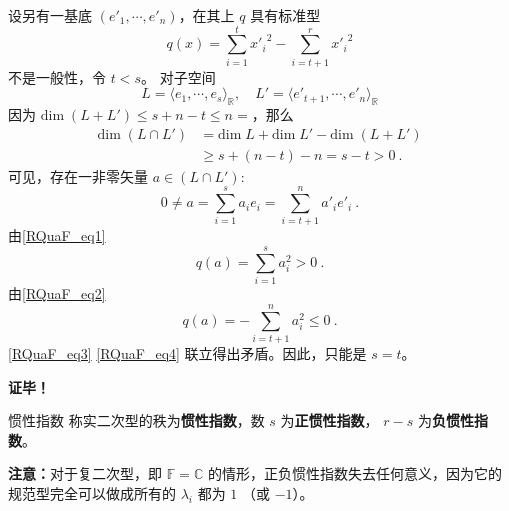 设另有一基底 $( e'_1,\cdots, e'_n)$，在其上 $q$ 具有标准型
\begin{equation}\label{RQuaF_eq2}
q( x)=\sum_{i=1}^{t}{x'_i}^2-\sum_{i=t+1}^{r} {x'_{i}}^{2}
\end{equation}
不是一般性，令 $t<s$。
对子空间
\begin{equation}
L=\langle  e_1,\cdots, e_s\rangle_\mathbb{R},\quad L'=\langle  e'_{t+1},\cdots, e'_n\rangle_\mathbb{R}
\end{equation}
因为 $\mathrm{dim}\;(L+L')\leq s+n-t\leq n=$，那么
\begin{equation}
\begin{aligned}
\mathrm{dim}\;(L\cap L')&=\mathrm{dim}\; L+\mathrm{dim}\; L'-\mathrm{dim}\;(L+L')\\
&\geq s+(n-t)-n=s-t> 0~.
\end{aligned}
\end{equation}
可见，存在一非零矢量 $ a\in(L\cap L')$:
\begin{equation}
 0\neq a=\sum_{i=1}^s a_i e_i=\sum_{i=t+1}^n a'_i  e'_i~.
\end{equation}
由\autoref{RQuaF_eq1} 
\begin{equation}\label{RQuaF_eq3}
q( a)=\sum_{i=1}^s a_i^2>0~.
\end{equation}
由\autoref{RQuaF_eq2} 
\begin{equation}\label{RQuaF_eq4}
q( a)=-\sum_{i=t+1}^n a_i^2\leq 0~.
\end{equation}
\autoref{RQuaF_eq3} \autoref{RQuaF_eq4} 联立得出矛盾。因此，只能是 $s=t$。

\textbf{证毕！}
\begin{definition}{惯性指数}\label{RQuaF_def1}
称实二次型的秩为\textbf{惯性指数}，数 $s$ 为\textbf{正惯性指数}， $r-s$ 为\textbf{负惯性指数}。
\end{definition}

\textbf{注意：}对于复二次型，即 $\mathbb F=\mathbb C$ 的情形，正负惯性指数失去任何意义，因为它的规范型完全可以做成所有的 $\lambda_i$ 都为 $1$ （或 $-1$）。